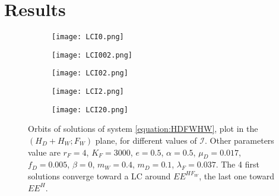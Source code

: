 \documentclass{article}
\newcommand{\lfw}{\lambda_{F}}
\newcommand{\lfw}{\lambda_{F}}
\newcommand{\cI}{\mathcal{I}}
\begin{document}
\section{Results}

\begin{figure}[!ht]
\centering
\begin{subfigure}{0.48\textwidth}
\centering
\texttt{[image: LCI0.png]}
\caption{}
\end{subfigure}
\begin{subfigure}{0.48\textwidth}
\centering
\texttt{[image: LCI002.png]}
\caption{}
\end{subfigure}
\hfill
\begin{subfigure}{0.49\textwidth}
\texttt{[image: LCI02.png]}
\caption{}
\end{subfigure}
\hfill
\begin{subfigure}{0.49\textwidth}
\texttt{[image: LCI2.png]}
\caption{}
\end{subfigure}
\begin{subfigure}{0.49\textwidth}
\texttt{[image: LCI20.png]}
\caption{}
\end{subfigure}
\caption{\centering Orbits of solutions of system \eqref{equation:HDFWHW}, plot in the $(H_D+H_W ; F_W)$ plane, for different values of $\cI$. Other parameters value are $r_F = 4$, $K_F=3000$, $e=0.5$, $\alpha = 0.5$, $\mu_D = 0.017$, $f_D = 0.005$, $\beta =0$, $m_W = 0.4$, $m_D = 0.1$, $\lfw = 0.037$. The 4 first solutions converge toward a LC around $EE^{HF_W}$, the last one toward $EE^{H}$.}
\end{figure}

\newpage



\end{document}

